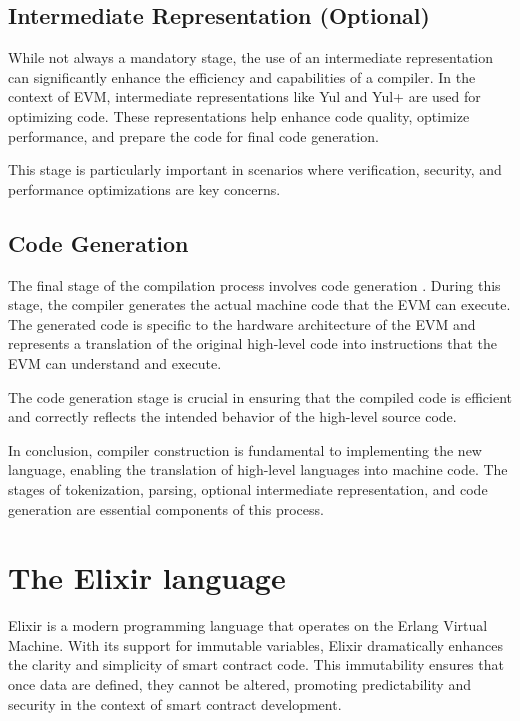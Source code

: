 \subsection{Intermediate Representation (Optional)}

While not always a mandatory stage, the use of an intermediate representation can significantly enhance the efficiency and capabilities of a compiler. In the context of EVM, intermediate representations like Yul and Yul+ are used for optimizing code. These representations help enhance code quality, optimize performance, and prepare the code for final code generation.

This stage is particularly important in scenarios where verification, security, and performance optimizations are key concerns.

\subsection{Code Generation}

The final stage of the compilation process involves code generation \cite[253-281]{CompilerConstruction}. During this stage, the compiler generates the actual machine code that the EVM can execute. The generated code is specific to the hardware architecture of the EVM and represents a translation of the original high-level code into instructions that the EVM can understand and execute.

The code generation stage is crucial in ensuring that the compiled code is efficient and correctly reflects the intended behavior of the high-level source code.


In conclusion, compiler construction is fundamental to implementing the new language, enabling the translation of high-level languages into machine code. The stages of tokenization, parsing, optional intermediate representation, and code generation are essential components of this process.

\section{The Elixir language \cite{ElixirOfficialWebSite}}
\label{sec:ex}

Elixir is a modern programming language that operates on the Erlang Virtual Machine. With its support for immutable variables, Elixir dramatically enhances the clarity and simplicity of smart contract code. This immutability ensures that once data are defined, they cannot be altered, promoting predictability and security in the context of smart contract development.

